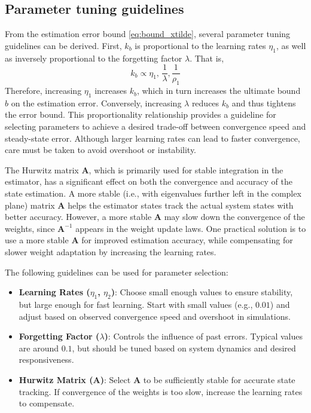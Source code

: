 \documentclass[10pt,twocolumn]{ICCAS}
\begin{document}
\subsection{Parameter tuning guidelines}

From the estimation error bound \eqref{eq:bound_xtilde}, several parameter tuning guidelines can be derived. First, $k_b$ is proportional to the learning rates $\eta_1$, as well as inversely proportional to the forgetting factor $\lambda$. That is,
\[
k_b \propto \eta_1,\, \frac{1}{\lambda}, \frac{1}{\rho_1}
\]
Therefore, increasing $\eta_1$ increases $k_b$, which in turn increases the ultimate bound $b$ on the estimation error. Conversely, increasing $\lambda$ reduces $k_b$ and thus tightens the error bound. This proportionality relationship provides a guideline for selecting parameters to achieve a desired trade-off between convergence speed and steady-state error.
Although larger learning rates can lead to faster convergence, care must be taken to avoid overshoot or instability.

The Hurwitz matrix $\mathbf{A}$, which is primarily used for stable integration in the estimator, has a significant effect on both the convergence and accuracy of the state estimation. A more stable (i.e., with eigenvalues further left in the complex plane) matrix $\mathbf{A}$ helps the estimator states track the actual system states with better accuracy. However, a more stable $\mathbf{A}$ may slow down the convergence of the weights, since $\mathbf{A}^{-1}$ appears in the weight update laws. One practical solution is to use a more stable $\mathbf{A}$ for improved estimation accuracy, while compensating for slower weight adaptation by increasing the learning rates.

The following guidelines can be used for parameter selection:
\begin{itemize}
    \item \textbf{Learning Rates ($\eta_1$, $\eta_2$)}: Choose small enough values to ensure stability, but large enough for fast learning. Start with small values (e.g., $0.01$) and adjust based on observed convergence speed and overshoot in simulations.
    \item \textbf{Forgetting Factor ($\lambda$)}: Controls the influence of past errors. Typical values are around $0.1$, but should be tuned based on system dynamics and desired responsiveness.
    \item \textbf{Hurwitz Matrix ($\mathbf{A}$)}: Select $\mathbf{A}$ to be sufficiently stable for accurate state tracking. If convergence of the weights is too slow, increase the learning rates to compensate.
\end{itemize}
\noindent
\end{document}
